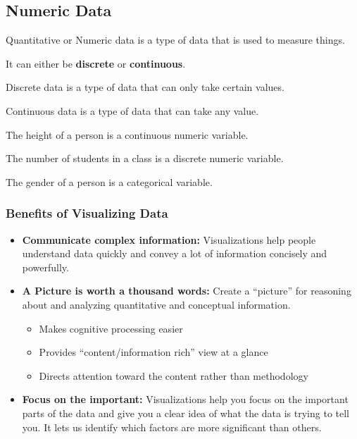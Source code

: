 \documentclass[11pt,fleqn]{book} %
\begin{document}
\newpage

\subsection{Numeric Data}
\begin{definition}
Quantitative or Numeric data is a type of data that is used to measure things.
\end{definition}
It can either be
\textbf{discrete} or \textbf{continuous}.

\begin{definition}
Discrete data is a type of data that can only take certain values.\\
\end{definition}

\begin{definition}
Continuous data is a type of data that can take any value.\\
\end{definition}

\begin{example}
  The height of a person is a continuous numeric variable.
\end{example}
\begin{example}
  The number of students in a class is a discrete numeric variable.
\end{example}
\begin{example}
  The gender of a person is a categorical variable.
\end{example}


\subsubsection{Benefits of Visualizing Data}
\begin{itemize}
    \item \textbf{Communicate complex information:}
      Visualizations help people understand data quickly
      and convey a lot of information concisely and powerfully.
    \item \textbf{A Picture is worth a thousand words:}
      Create a “picture” for reasoning about and analyzing
      quantitative and conceptual information.
      \begin{itemize}
        \item Makes cognitive processing easier
        \item Provides “content/information rich” view at a glance
        \item Directs attention toward the content rather than methodology
      \end{itemize}
    \item \textbf{Focus on the important:}
      Visualizations help you focus on the important parts of the data
      and give you a clear idea of what the data is trying to tell you.
      It lets us identify which factors are more significant than others.
\end{itemize}
\end{document}
